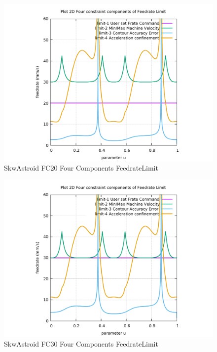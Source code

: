 \begin{figure}
	\caption     {SkwAstroid FC20 Four Components FeedrateLimit}
	\label{32-img-SkwAstroid-FC20-Four-Components-FeedrateLimit.pdf}
	\includegraphics[width=1.00\textwidth]{Chap4/appendix/app-SkwAstroid/plots/32-img-SkwAstroid-FC20-Four-Components-FeedrateLimit.pdf}
\end{figure}


\clearpage
\pagebreak

\begin{figure}
	\caption     {SkwAstroid FC30 Four Components FeedrateLimit}
	\label{33-img-SkwAstroid-FC30-Four-Components-FeedrateLimit.pdf}
	\includegraphics[width=1.00\textwidth]{Chap4/appendix/app-SkwAstroid/plots/33-img-SkwAstroid-FC30-Four-Components-FeedrateLimit.pdf}
\end{figure}


